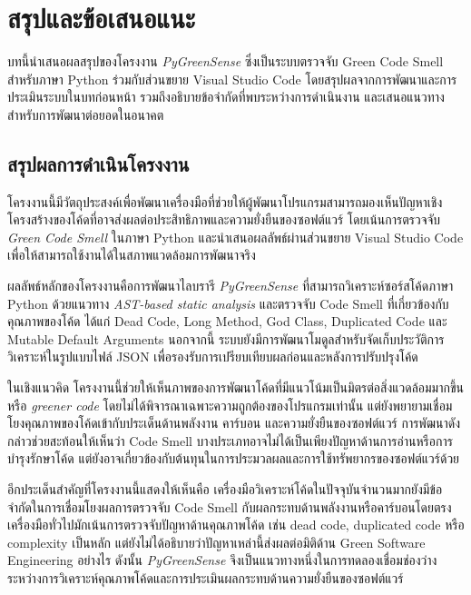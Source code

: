 \chapter{สรุปและข้อเสนอแนะ}
\label{Ch:Conclusion}

บทนี้นำเสนอผลสรุปของโครงงาน \textit{PyGreenSense} ซึ่งเป็นระบบตรวจจับ Green Code Smell สำหรับภาษา Python ร่วมกับส่วนขยาย Visual Studio Code โดยสรุปผลจากการพัฒนาและการประเมินระบบในบทก่อนหน้า รวมถึงอธิบายข้อจำกัดที่พบระหว่างการดำเนินงาน และเสนอแนวทางสำหรับการพัฒนาต่อยอดในอนาคต


\section{สรุปผลการดำเนินโครงงาน}

โครงงานนี้มีวัตถุประสงค์เพื่อพัฒนาเครื่องมือที่ช่วยให้ผู้พัฒนาโปรแกรมสามารถมองเห็นปัญหาเชิงโครงสร้างของโค้ดที่อาจส่งผลต่อประสิทธิภาพและความยั่งยืนของซอฟต์แวร์ โดยเน้นการตรวจจับ \textit{Green Code Smell} ในภาษา Python และนำเสนอผลลัพธ์ผ่านส่วนขยาย Visual Studio Code เพื่อให้สามารถใช้งานได้ในสภาพแวดล้อมการพัฒนาจริง

ผลลัพธ์หลักของโครงงานคือการพัฒนาไลบรารี \textit{PyGreenSense} ที่สามารถวิเคราะห์ซอร์สโค้ดภาษา Python ด้วยแนวทาง \textit{AST-based static analysis} และตรวจจับ Code Smell ที่เกี่ยวข้องกับคุณภาพของโค้ด ได้แก่ Dead Code, Long Method, God Class, Duplicated Code และ Mutable Default Arguments นอกจากนี้ ระบบยังมีการพัฒนาโมดูลสำหรับจัดเก็บประวัติการวิเคราะห์ในรูปแบบไฟล์ JSON เพื่อรองรับการเปรียบเทียบผลก่อนและหลังการปรับปรุงโค้ด

ในเชิงแนวคิด โครงงานนี้ช่วยให้เห็นภาพของการพัฒนาโค้ดที่มีแนวโน้มเป็นมิตรต่อสิ่งแวดล้อมมากขึ้น หรือ \textit{greener code} โดยไม่ได้พิจารณาเฉพาะความถูกต้องของโปรแกรมเท่านั้น แต่ยังพยายามเชื่อมโยงคุณภาพของโค้ดเข้ากับประเด็นด้านพลังงาน คาร์บอน และความยั่งยืนของซอฟต์แวร์ การพัฒนาดังกล่าวช่วยสะท้อนให้เห็นว่า Code Smell บางประเภทอาจไม่ได้เป็นเพียงปัญหาด้านการอ่านหรือการบำรุงรักษาโค้ด แต่ยังอาจเกี่ยวข้องกับต้นทุนในการประมวลผลและการใช้ทรัพยากรของซอฟต์แวร์ด้วย

อีกประเด็นสำคัญที่โครงงานนี้แสดงให้เห็นคือ เครื่องมือวิเคราะห์โค้ดในปัจจุบันจำนวนมากยังมีข้อจำกัดในการเชื่อมโยงผลการตรวจจับ Code Smell กับผลกระทบด้านพลังงานหรือคาร์บอนโดยตรง เครื่องมือทั่วไปมักเน้นการตรวจจับปัญหาด้านคุณภาพโค้ด เช่น dead code, duplicated code หรือ complexity เป็นหลัก แต่ยังไม่ได้อธิบายว่าปัญหาเหล่านี้ส่งผลต่อมิติด้าน Green Software Engineering อย่างไร ดังนั้น \textit{PyGreenSense} จึงเป็นแนวทางหนึ่งในการทดลองเชื่อมช่องว่างระหว่างการวิเคราะห์คุณภาพโค้ดและการประเมินผลกระทบด้านความยั่งยืนของซอฟต์แวร์

